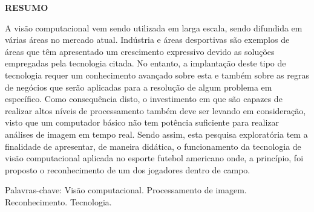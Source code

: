 \begin{center}
\textbf{RESUMO}
\end{center}

$\!$\\
\noindent
A visão computacional vem sendo utilizada em larga escala, sendo difundida em várias áreas no mercado atual. Indústria e áreas desportivas são exemplos de áreas que têm apresentado um crescimento expressivo devido as soluções empregadas pela tecnologia citada. No entanto, a implantação deste tipo de tecnologia requer um conhecimento avançado sobre esta e também sobre as regras de negócios que serão aplicadas para a resolução de algum problema em específico. Como consequência disto, o investimento em  que são capazes de realizar altos níveis de processamento também deve ser levando em consideração, visto que um computador básico não tem potência suficiente para realizar análises de imagem em tempo real. Sendo assim, esta pesquisa exploratória tem a finalidade de apresentar, de maneira didática, o funcionamento da tecnologia de visão computacional aplicada no esporte futebol americano onde, a princípio, foi proposto o reconhecimento de um dos jogadores dentro de campo.

\vspace{1cm}

\hspace{0cm}Palavras-chave: Visão computacional. Processamento de imagem. Reconhecimento. Tecnologia.

